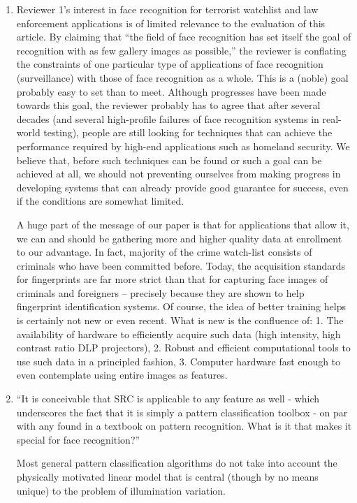 \documentclass[11pt]{article}
\begin{document}
\begin{enumerate}
\item Reviewer 1's interest in face recognition for terrorist watchlist and law
enforcement applications is of limited relevance to the evaluation of this
article.  By claiming that ``the field of face recognition has set itself the
goal of recognition with as few gallery images as possible,'' the reviewer is
conflating the constraints of one particular type of applications of face recognition
(surveillance) with those of face recognition as a whole. This is a (noble) goal probably easy to
set than to meet. Although progresses have been made towards this goal, the reviewer
probably has to agree that after several decades (and several high-profile failures of
face recognition systems in real-world testing), people are still looking for techniques 
that can achieve the performance required by high-end applications such as homeland 
security. We believe that, before such techniques can be found or such a goal can be
achieved at all, we should not preventing ourselves from making progress in developing systems that 
can already provide good guarantee for success, even if the conditions are somewhat limited. 

A huge part of the message of our paper is that for applications that allow it, we can and should
be gathering more and higher quality data at enrollment to our advantage. In fact, majority 
of the crime watch-list consists of criminals who have been committed before. Today,
the acquisition standards for fingerprints are far more strict than that for
capturing face images of criminals and foreigners -- precisely because they are shown to
help fingerprint identification systems. Of course, the idea of better training helps is certainly
not new or even recent.  What is new is the confluence of: 1. The availability
of hardware to efficiently acquire such data (high intensity, high contrast
ratio DLP projectors), 2. Robust and efficient computational tools to use such data in a
principled fashion, 3. Computer hardware fast enough to even contemplate using
entire images as features.


\item ``It is conceivable that SRC is applicable to any feature as well - which
underscores the fact that it is simply a pattern classification toolbox - on
par with any found in a textbook on pattern recognition. What is it that makes
it special for face recognition?''

Most general pattern classification algorithms do not take into account the
physically motivated linear model that is central (though by no means unique)
to the problem of illumination variation.


\end{enumerate}
\end{document}
